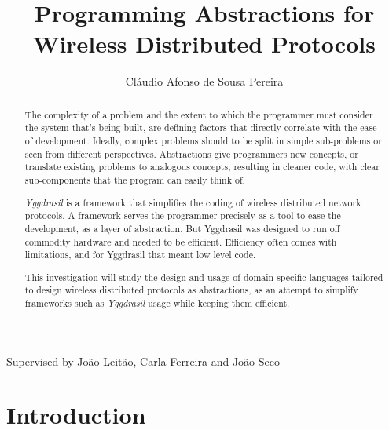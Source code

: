 \documentclass[runningheads]{llncs}
\begin{document}
\title{Programming Abstractions for Wireless Distributed Protocols}
\author{Cláudio Afonso de Sousa Pereira}

\maketitle

\begin{center} Supervised by João Leitão, Carla Ferreira and João Seco \end{center}
\begin{abstract}
The complexity of a problem and the extent to which the programmer must consider the system that's being built, are defining factors that directly correlate with the ease of development.
Ideally, complex problems should to be split in simple sub-problems or seen from different perspectives. Abstractions give programmers new concepts, or translate existing problems to analogous concepts, resulting in cleaner code, with clear sub-components that the program can easily think of.
\par \textit{Yggdrasil} is a framework that simplifies the coding of wireless distributed network protocols. A framework serves the programmer precisely as a tool to ease the development, as a layer of abstraction. But Yggdrasil was designed to run off commodity hardware and needed to be efficient. Efficiency often comes with limitations, and for Yggdrasil that meant low level code.
\par This investigation will study the design and usage of domain-specific languages tailored to design wireless distributed protocols as abstractions, as an attempt to simplify frameworks such as \textit{Yggdrasil} usage while keeping them efficient.

\end{abstract}

\section{Introduction}
\end{document}
